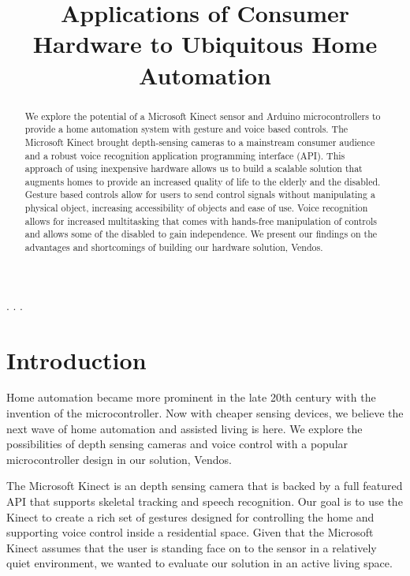 \documentclass{chi-ext}
\title{Applications of Consumer Hardware to Ubiquitous Home Automation}
\author{
  \alignauthor{
  	\textbf{Kirsten Koa}\\
  	\email{kkoa@ucsd.edu}
  }\alignauthor{
  	\textbf{Chu Shao}\\
  	\email{chsao@eng.ucsd.edu}
  }
  \vfil
  \alignauthor{
  	\textbf{Derek Huynh}\\
  	\email{dbhuynh@ucsd.edu}
  }\alignauthor{
  	\textbf{Patrick Torbett}\\
  	\email{ptorbett@ucsd.edu}
  }
  \vfil
  \alignauthor{
  	\textbf{Calvin Nguyen}\\
  	\email{cbn004@ucsd.edu}
  }
}
\def\plainkeywords{automation, arduino, kinect, voice, gesture}
\begin{document}
\maketitle

\begin{abstract}
We explore the potential of a Microsoft Kinect sensor and Arduino microcontrollers to provide a home automation system with gesture and voice based controls.
The Microsoft Kinect brought depth-sensing cameras to a mainstream consumer audience and a robust voice recognition application programming interface (API).
This approach of using inexpensive hardware allows us to build a scalable solution that augments homes to provide an increased quality of life to the elderly and the disabled.
Gesture based controls allow for users to send control signals without manipulating a physical object, increasing accessibility of objects and ease of use.
Voice recognition allows for increased multitasking that comes with hands-free manipulation of controls and allows some of the disabled to gain independence.
We present our findings on the advantages and shortcomings of building our hardware solution, Vendos.
\end{abstract}

\keywords{\plainkeywords}

.
.
.


\section{Introduction}

Home automation became more prominent in the late 20th century with the invention of the microcontroller.
Now with cheaper sensing devices, we believe the next wave of home automation and assisted living is here.
We explore the possibilities of depth sensing cameras and voice control with a popular microcontroller design in our solution, Vendos.

The Microsoft Kinect is an depth sensing camera that is backed by a full featured API that supports skeletal tracking and speech recognition.
Our goal is to use the Kinect to create a rich set of gestures designed for controlling the home and supporting voice control inside a residential space.
Given that the Microsoft Kinect assumes that the user is standing face on to the sensor in a relatively quiet environment, we wanted to evaluate our solution in an active living space.
\end{document}
